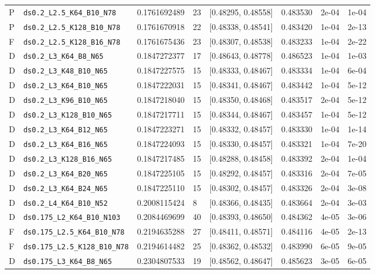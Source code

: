 \begin{longtable}{@{}llrllllr@{}}
P & \texttt{ds0.2\_L2.5\_K64\_B10\_N78} & 0.1761692489 & 23 & [0.48295, 0.48558] & 0.483530 & 2e-04 & 1e-04\\
P & \texttt{ds0.2\_L2.5\_K128\_B10\_N78} & 0.1761670918 & 22 & [0.48338, 0.48541] & 0.483420 & 1e-04 & 2e-13\\
F & \texttt{ds0.2\_L2.5\_K128\_B16\_N78} & 0.1761675436 & 23 & [0.48307, 0.48538] & 0.483233 & 1e-04 & 2e-22\\
D & \texttt{ds0.2\_L3\_K64\_B8\_N65} & 0.1847272377 & 17 & [0.48643, 0.48778] & 0.486523 & 1e-04 & 1e-03\\
D & \texttt{ds0.2\_L3\_K48\_B10\_N65} & 0.1847227575 & 15 & [0.48333, 0.48467] & 0.483334 & 1e-04 & 6e-04\\
D & \texttt{ds0.2\_L3\_K64\_B10\_N65} & 0.1847222031 & 15 & [0.48341, 0.48467] & 0.483442 & 1e-04 & 5e-12\\
D & \texttt{ds0.2\_L3\_K96\_B10\_N65} & 0.1847218040 & 15 & [0.48350, 0.48468] & 0.483517 & 2e-04 & 5e-12\\
D & \texttt{ds0.2\_L3\_K128\_B10\_N65} & 0.1847217711 & 15 & [0.48344, 0.48467] & 0.483457 & 1e-04 & 5e-12\\
D & \texttt{ds0.2\_L3\_K64\_B12\_N65} & 0.1847223271 & 15 & [0.48332, 0.48457] & 0.483330 & 1e-04 & 1e-14\\
D & \texttt{ds0.2\_L3\_K64\_B16\_N65} & 0.1847224093 & 15 & [0.48330, 0.48457] & 0.483321 & 1e-04 & 7e-20\\
D & \texttt{ds0.2\_L3\_K128\_B16\_N65} & 0.1847217485 & 15 & [0.48288, 0.48458] & 0.483392 & 2e-04 & 1e-04\\
D & \texttt{ds0.2\_L3\_K64\_B20\_N65} & 0.1847225105 & 15 & [0.48292, 0.48457] & 0.483316 & 2e-04 & 7e-05\\
D & \texttt{ds0.2\_L3\_K64\_B24\_N65} & 0.1847225110 & 15 & [0.48302, 0.48457] & 0.483326 & 2e-04 & 3e-08\\
D & \texttt{ds0.2\_L4\_K64\_B10\_N52} & 0.2008115424 & 8 & [0.48366, 0.48435] & 0.483664 & 2e-04 & 3e-03\\
D & \texttt{ds0.175\_L2\_K64\_B10\_N103} & 0.2084469699 & 40 & [0.48393, 0.48650] & 0.484362 & 4e-05 & 3e-06\\
F & \texttt{ds0.175\_L2.5\_K64\_B10\_N78} & 0.2194635288 & 27 & [0.48411, 0.48571] & 0.484116 & 4e-05 & 2e-13\\
F & \texttt{ds0.175\_L2.5\_K128\_B10\_N78} & 0.2194614482 & 25 & [0.48362, 0.48532] & 0.483990 & 6e-05 & 9e-05\\
D & \texttt{ds0.175\_L3\_K64\_B8\_N65} & 0.2304807533 & 19 & [0.48562, 0.48647] & 0.485623 & 3e-05 & 6e-05\\

\end{longtable}
